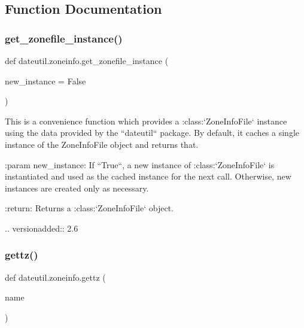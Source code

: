 \subsection{Function Documentation}
\mbox{\label{namespacedateutil_1_1zoneinfo_a75c4f3206fb4ce7cac96842fbcec71ea}} 
\subsubsection{\texorpdfstring{get\+\_\+zonefile\+\_\+instance()}{get\_zonefile\_instance()}}
{\footnotesize\ttfamily def dateutil.\+zoneinfo.\+get\+\_\+zonefile\+\_\+instance (\begin{DoxyParamCaption}\item[{}]{new\+\_\+instance = {\ttfamily False} }\end{DoxyParamCaption})}

\begin{DoxyVerb}This is a convenience function which provides a :class:`ZoneInfoFile`
instance using the data provided by the ``dateutil`` package. By default, it
caches a single instance of the ZoneInfoFile object and returns that.

:param new_instance:
    If ``True``, a new instance of :class:`ZoneInfoFile` is instantiated and
    used as the cached instance for the next call. Otherwise, new instances
    are created only as necessary.

:return:
    Returns a :class:`ZoneInfoFile` object.

.. versionadded:: 2.6
\end{DoxyVerb}
 \mbox{\label{namespacedateutil_1_1zoneinfo_ad0d7307684458e5d285cbff60c1e2617}} 
\subsubsection{\texorpdfstring{gettz()}{gettz()}}
{\footnotesize\ttfamily def dateutil.\+zoneinfo.\+gettz (\begin{DoxyParamCaption}\item[{}]{name }\end{DoxyParamCaption})}

